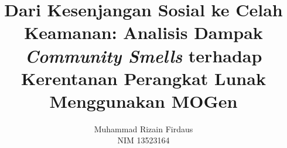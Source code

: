 \title{Dari Kesenjangan Sosial ke Celah Keamanan: Analisis Dampak \textit{Community Smells} terhadap Kerentanan Perangkat Lunak Menggunakan MOGen}
\date{}
\author{
    Muhammad Rizain Firdaus \\
    NIM 13523164
}
